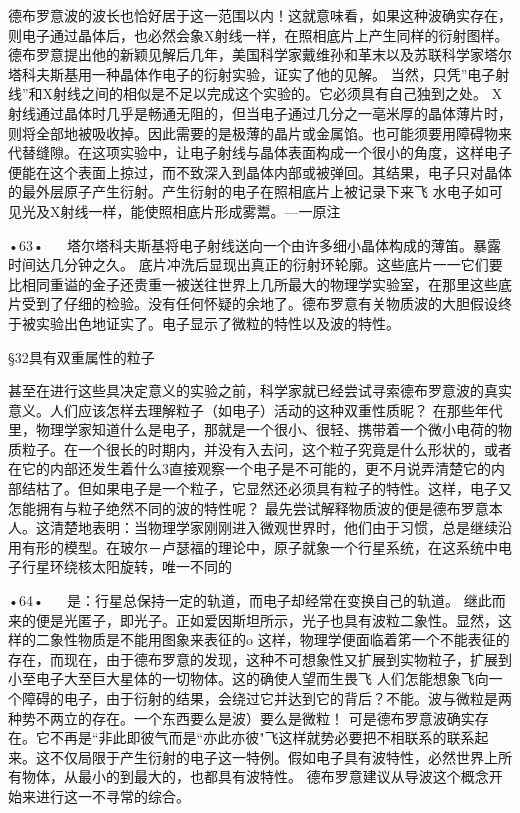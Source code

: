 德布罗意波的波长也恰好居于这一范围以内！这就意味看，如果这种波确实存在，则电子通过晶体后，也必然会象X射线一样，在照相底片上产生同样的衍射图样。
德布罗意提出他的新颖见解后几年，美国科学家戴维孙和革末以及苏联科学家塔尔塔科夫斯基用一种晶体作电子的衍射实验，证实了他的见解。
当然，只凭”电子射线”和X射线之间的相似是不足以完成这个实验的。它必须具有自己独到之处。
X射线通过晶体时几乎是畅通无阻的，但当电子通过几分之一亳米厚的晶体薄片时，则将全部地被吸收掉。因此需要的是极薄的晶片或金属馅。也可能须要用障碍物来代替缝隙。在这项实验中，让电子射线与晶体表面构成一个很小的角度，这样电子便能在这个表面上掠过，而不致深入到晶体内部或被弹回。其结果，电子只对晶体的最外层原子产生衍射。产生衍射的电子在照相底片上被记录下来飞
水电子如可见光及X射线一样，能使照相底片形成雾鬻。—一原注

•63•
  
塔尔塔科夫斯基将电子射线送向一个由许多细小晶体构成的薄笛。暴露时间达几分钟之久。
底片冲洗后显现出真正的衍射环轮廓。这些底片一一它们要比相同重谥的金子还贵重一被送往世界上几所最大的物理学实验室，在那里这些底片受到了仔细的检验。没有任何怀疑的余地了。德布罗意有关物质波的大胆假设终于被实验出色地证实了。电子显示了微粒的特性以及波的特性。

§32具有双重属性的粒子

甚至在进行这些具决定意义的实验之前，科学家就已经尝试寻索德布罗意波的真实意义。人们应该怎样去理解粒子（如电子）活动的这种双重性质昵？
在那些年代里，物理学家知道什么是电子，那就是一个很小、很轻、携带着一个微小电荷的物质粒子。在一个很长的时期内，并没有入去问，这个粒子究竟是什么形状的，或者在它的内部还发生着什么3直接观察一个电子是不可能的，更不月说弄清楚它的内部结枯了。但如果电子是一个粒子，它显然还必须具有粒子的特性。这样，电子又怎能拥有与粒子绝然不同的波的特性呢？
最先尝试解释物质波的便是德布罗意本人。这清楚地表明：当物理学家刚刚进入微观世界时，他们由于习惯，总是继续沿用有形的模型。在玻尔－卢瑟福的理论中，原子就象一个行星系统，在这系统中电子行星环绕核太阳旋转，唯一不同的

•64•
  
是：行星总保持一定的轨道，而电子却经常在变换自己的轨道。
继此而来的便是光匿子，即光子。正如爱因斯坦所示，光子也具有波粒二象性。显然，这样的二象性物质是不能用图象来表征的o
这样，物理学便面临着笫一个不能表征的存在，而现在，由于德布罗意的发现，这种不可想象性又扩展到实物粒子，扩展到小至电子大至巨大星体的一切物体。这的确使人望而生畏飞
人们怎能想象飞向一个障碍的电子，由于衍射的结果，会绕过它并达到它的背后？不能。波与微粒是两种势不两立的存在。一个东西要么是波）要么是微粒！
可是德布罗意波确实存在。它不再是“非此即彼气而是“亦此亦彼"飞这样就势必要把不相联系的联系起来。这不仅局限于产生衍射的电子这一特例。假如电子具有波特性，必然世界上所有物体，从最小的到最大的，也都具有波特性。
德布罗意建议从导波这个概念开始来进行这一不寻常的综合。

